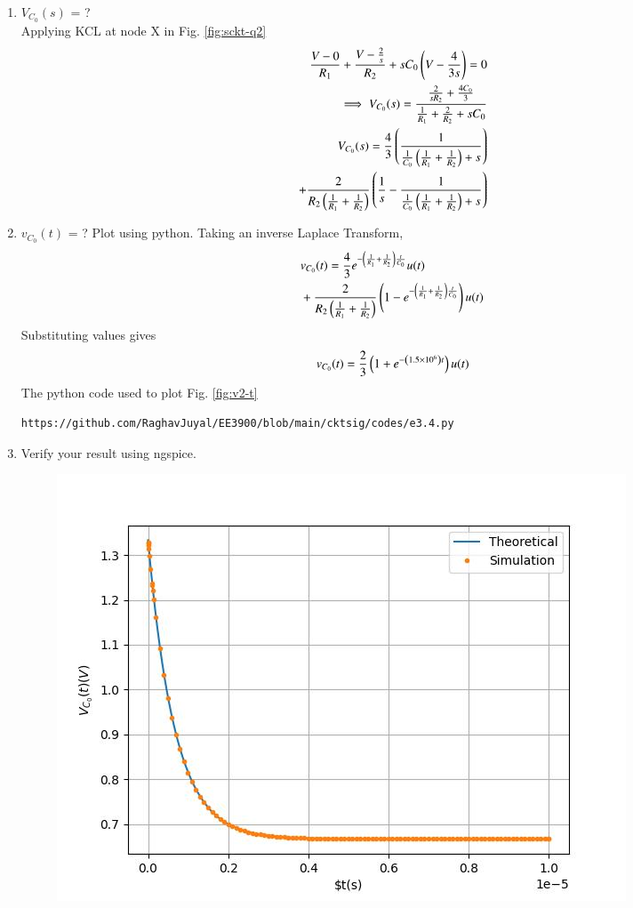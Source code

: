 \documentclass[journal,12pt,twocolumn]{IEEEtran}
\renewcommand\thesection{\arabic{section}}
\begin{document}
\begin{enumerate}[label=\arabic*.,ref=\thesection.\theenumi]
\item $V_{C_0}(s)$ = ?
\solution\\
Applying KCL at node X in Fig. \ref{fig:sckt-q2}
\begin{align}
	\frac{V - 0}{R_1} + \frac{V - \frac{2}{s}}{R_2} + sC_0\left(V - \frac{4}{3s}\right) = 0 \\
	\implies V_{C_0}(s) = \frac{\frac{2}{sR_2} + \frac{4C_0}{3}}{\frac{1}{R_1} + \frac{2}{R_2} + sC_0}\\
	\label{eq:v2-s}
	V_{C_0}(s) = \frac{4}{3}\left(\frac{1}{\frac{1}{C_0}\left(\frac{1}{R_1} + \frac{1}{R_2}\right)+s}\right) \nonumber \\
	+ \frac{2}{R_2\left(\frac{1}{R_1} +\frac{1}{R_2}\right)}\left(\frac{1}{s} - \frac{1}{\frac{1}{C_0}\left(\frac{1}{R_1} + \frac{1}{R_2}\right) + s}\right)
\end{align}
\item $v_{C_0}(t)$ = ? Plot using python.
Taking an inverse Laplace Transform,
\begin{align}
	&v_{C_0}(t) = \frac{4}{3}e^{-\left(\frac{1}{R_1} + \frac{1}{R_2}\right)\frac{t}{C_0}}u(t) \nonumber \\ 
	&+ \frac{2}{R_2\left(\frac{1}{R_1}+\frac{1}{R_2}\right)}\left(1 - e^{-\left(\frac{1}{R_1} + \frac{1}{R_2}\right)\frac{t}{C_0}}\right)u(t)
\end{align}
Substituting values gives
\begin{align}
	v_{C_0}(t) = \frac{2}{3}\left(1 +e^{-\left(1.5 \times 10^6\right)t}\right)u(t)
	\label{eq:v2-t}
\end{align}
The python code used to plot Fig. \ref{fig:v2-t}
\begin{lstlisting}
https://github.com/RaghavJuyal/EE3900/blob/main/cktsig/codes/e3.4.py
\end{lstlisting}
\item Verify your result using ngspice.\\
\solution
\begin{figure}[!htb]
	\includegraphics[width=\columnwidth]{./figs/e3.4.jpg}

\end{figure}
\end{enumerate}
\end{document}
